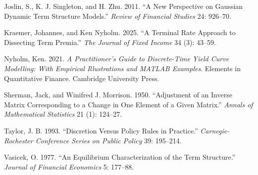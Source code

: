 \documentclass[
  letterpaper,
  DIV=11,
  numbers=noendperiod]{scrreprt}
\newlength{\cslhangindent}
\newenvironment{CSLReferences}[2] %
 {\begin{list}{}{%
  \setlength{\itemindent}{0pt}
  \setlength{\leftmargin}{0pt}
  \setlength{\parsep}{0pt}
  \ifodd #1
   \setlength{\leftmargin}{\cslhangindent}
   \setlength{\itemindent}{-1\cslhangindent}
  \fi
  \setlength{\itemsep}{#2\baselineskip}}}
 {\end{list}}
\begin{document}
\begin{CSLReferences}{1}{1}
Joslin, S., K. J. Singleton, and H. Zhu. 2011. {``A New Perspective on
Gaussian Dynamic Term Structure Models.''} \emph{Review of Financial
Studies} 24: 926--70.

Kraemer, Johannes, and Ken Nyholm. 2025. {``A Terminal Rate Approach to
Dissecting Term Premia.''} \emph{The Journal of Fixed Income} 34 (3):
43--59.

Nyholm, Ken. 2021. \emph{A Practitioner's Guide to Discrete-Time Yield
Curve Modelling: With Empirical Illustrations and MATLAB Examples}.
Elements in Quantitative Finance. Cambridge University Press.

Sherman, Jack, and Winifred J. Morrison. 1950. {``Adjustment of an
Inverse Matrix Corresponding to a Change in One Element of a Given
Matrix.''} \emph{Annals of Mathematical Statistics} 21 (1): 124--27.

Taylor, J. B. 1993. {``Discretion Versus Policy Rules in Practice.''}
\emph{Carnegie-Rochester Conference Series on Public Policy} 39:
195--214.

Vasicek, O. 1977. {``An Equilibrium Characterization of the Term
Structure.''} \emph{Journal of Financial Economics} 5: 177--88.

\end{CSLReferences}
\end{document}

